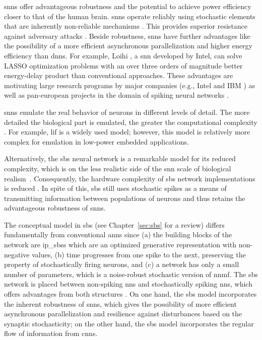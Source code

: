 \glspl{snn} offer advantageous robustness and the potential to achieve power efficiency closer to that of the human brain.
\glspl{snn} operate reliably using stochastic elements that are inherently non-reliable mechanisms \cite{mcdonnell2011benefits}.
This provides superior resistance against adversary attacks
\cite{ernst2007efficient, Dapello2020.06.16.154542}. Beside
robustness, \glspl{snn} have further advantages like the possibility of a more efficient asynchronous parallelization and higher
energy efficiency than \glspl{dnn}. For
example, Loihi \cite{davies2018loihi}, a \gls{snn} developed by Intel, can
solve LASSO optimization problems with an over three orders of
magnitude better energy-delay product than conventional
approaches. These advantages are motivating large research programs by
major companies (e.g., Intel \cite{davies2018loihi} and IBM
\cite{TrueNorth_Trans15}) as well as pan-european projects in the
domain of spiking neural networks \cite{Spinnaker_Trans13}.


\glspl{snn} emulate the real behavior of neurons in different levels of detail. The more detailed the biological part is emulated, the greater the computational complexity \cite{izhikevich2004model,amunts2019human}. For example, \gls{lif} is a widely used model; however, this model is relatively more complex for emulation in low-power embedded applications.
	
	Alternatively, the \gls{sbs} neural network is a remarkable model for its reduced complexity, which is on the less realistic side of the \gls{snn} scale of biological realism~\cite{rotermund2019Backpropagation,ernst2007efficient}. Consequently, the hardware complexity of \gls{sbs} network implementations is reduced
	\cite{nevarez2020accelerator,rotermund2018massively}. In spite of this, \gls{sbs} still uses stochastic spikes as a means of transmitting information between populations of neurons and thus retains the advantageous robustness of \glspl{snn}.


The conceptual model in \gls{sbs} (see Chapter~\ref{sec:sbs} for a review) differs fundamentally from conventional \glspl{ann} since (a) the building blocks of the network are \glspl{ip_sbs} which are an optimized generative representation with non-negative values, (b) time progresses from one spike to the next, preserving the property of stochastically firing neurons, and (c) a network has only a small number of parameters, which is a noise-robust stochastic version of \gls{nnmf}. The \gls{sbs} network is placed between non-spiking \glspl{nn} and stochastically spiking \glspl{nn}, which offers advantages from both structures \cite{rotermund2019Backpropagation}. On one hand, the \gls{sbs} model incorporates the inherent robustness of \glspl{snn}, which gives the possibility of more efficient asynchronous parallelization and resilience against disturbances based on the synaptic stochasticity; on the other hand, the \gls{sbs} model incorporates the regular flow of information from \glspl{cnn}.  


